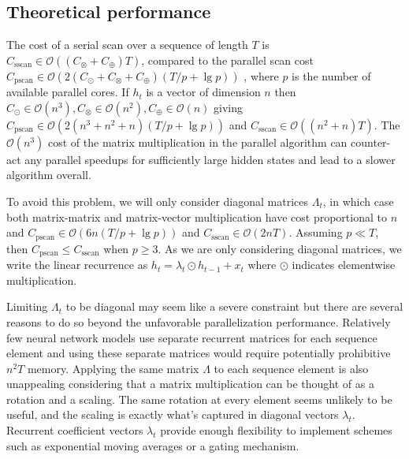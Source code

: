 \documentclass{article}
\begin{document}
\subsection{Theoretical performance}
The cost of a serial scan over a sequence of length $T$ is 
$C_\text{sscan} \in \mathcal{O}((C_\otimes + C_\oplus)T)$, compared to the parallel scan cost
$C_\text{pscan} \in \mathcal{O}(2(C_\odot + C_\otimes + C_\oplus)(T/p + \lg p))$ \cite{blelloch1990prefix},
where \(p\) is the number of available parallel cores. 
If $h_t$ is a vector of dimension $n$ then 
$C_\odot \in  \mathcal{O}(n^3), C_\otimes \in \mathcal{O}(n^2), C_\oplus \in \mathcal{O}(n)$ giving
$C_\text{pscan} \in \mathcal{O}(2(n^3 + n^2 + n)(T/p + \lg p))$ and 
$C_\text{sscan} \in \mathcal{O}((n^2 + n)T)$. The $\mathcal{O}(n^3)$ cost of the matrix
multiplication in the parallel algorithm can counter-act any parallel speedups for
sufficiently large hidden states and lead to a slower algorithm overall.

To avoid this problem, we will only consider diagonal matrices $\Lambda_t$, in
which case both matrix-matrix and matrix-vector multiplication have cost
proportional to $n$ and $C_\text{pscan}\in \mathcal{O}(6n(T/p + \lg p))$ and
$C_\text{sscan} \in \mathcal{O}(2nT)$. Assuming $p \ll T$, then $C_\text{pscan} \le
C_\text{sscan}$ when $p \ge 3$.
As we are only considering diagonal matrices,
we write the linear recurrence as $h_t = \lambda_t \odot h_{t-1} + x_t$
where $\odot$ indicates elementwise multiplication.

Limiting $\Lambda_t$ to be diagonal may seem like a severe constraint but there are
several reasons to do so beyond the unfavorable parallelization performance. Relatively few neural
network models use separate recurrent matrices for each sequence element and using these
separate matrices would require potentially prohibitive $n^2T$ memory.
Applying
the same matrix $\Lambda$ to each sequence element is also unappealing considering that a matrix
multiplication can be thought of as a rotation and a scaling. The same rotation at every
element seems unlikely to be useful, and the scaling is exactly what's captured in diagonal
vectors $\lambda_t$. Recurrent coefficient vectors $\lambda_t$ provide enough flexibility
to implement schemes such as exponential moving averages or a gating mechanism.
\end{document}
